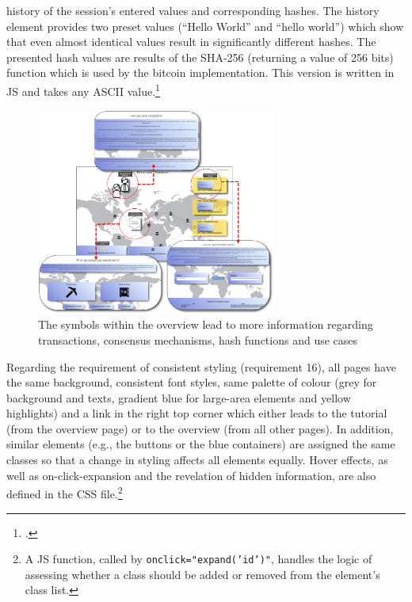 history of the session's entered values and corresponding hashes. The history element provides two preset values (\enquote{Hello World} and \enquote{hello world}) which show that even almost identical values result in significantly different hashes. The presented hash values are results of the \ac{SHA}-256 (returning a value of 256 bits) function which is used by the bitcoin implementation. This version is written in \acl{JS} and takes any ASCII value.\footcite[][]{LuffJavaScriptSHA256demo2014}

\begin{figure}
    \centering
    \includegraphics[width=0.7\textwidth]{latex-vorlage_v1.5/graphics/overview.png}
    \caption[The symbols within the overview lead to more information regarding transactions, consensus mechanisms, hash functions and use cases]{The symbols within the overview lead to more information regarding transactions, consensus mechanisms, hash functions and use cases\protect\footnotemark}
    \label{fig:AniOW}
\end{figure}

Regarding the requirement of consistent styling (requirement 16), all pages have the same background, consistent font styles, same palette of colour (grey for background and texts, gradient blue for large-area elements and yellow highlights) and a link in the right top corner which either leads to the tutorial (from the overview page) or to the overview (from all other pages). In addition, similar elements (e.g., the buttons or the blue containers) are assigned the same classes so that a change in styling affects all elements equally. Hover effects, as well as on-click-expansion and the revelation of hidden information, are also defined in the \ac{CSS} file.\footnote{A \ac{JS} function, called by \texttt{onclick="expand('id')"}, handles the logic of assessing whether a class should be added or removed from the element's class list.} 


